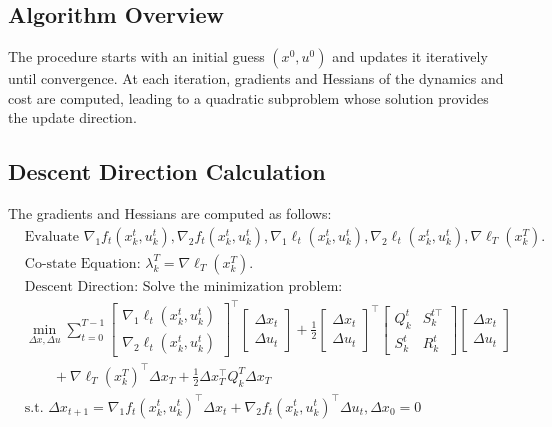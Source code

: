 \documentclass[a4paper,11pt,oneside]{book}
\begin{document}
\subsection{Algorithm Overview}
The procedure starts with an initial guess $(x^0, u^0)$ and updates it iteratively until convergence. At each iteration, gradients and Hessians of the dynamics and cost are computed, leading to a quadratic subproblem whose solution provides the update direction.

\subsection{Descent Direction Calculation}
The gradients and Hessians are computed as follows:
\begin{align}
&\text{Evaluate } \nabla_1 f_t(x_k^t, u_k^t), \nabla_2 f_t(x_k^t, u_k^t), \nabla_1 \ell_t(x_k^t, u_k^t),\nabla_2 \ell_t(x_k^t, u_k^t), \nabla \ell_T(x_k^T).\nonumber\\
&\text{Co-state Equation: } \lambda_k^T = \nabla \ell_T(x_k^T).\nonumber\\
&\text{Descent Direction: Solve the minimization problem:}\nonumber\\
&\min_{\Delta x, \Delta u} \sum_{t=0}^{T-1} \left[ \begin{array}{c}
\nabla_1 \ell_t(x_k^t, u_k^t) \\
\nabla_2 \ell_t(x_k^t, u_k^t)
\end{array} \right]^{\top} \left[ \begin{array}{c}
\Delta x_t\\
\Delta u_t
\end{array} \right] + \frac{1}{2} \left[ \begin{array}{c}
\Delta x_t \\
\Delta u_t
\end{array} \right]^{\top} \left[ \begin{array}{cc}
Q_k^t & S_k^{t\top} \\
S_k^t & R_k^t
\end{array} \right] \left[ \begin{array}{c}
\Delta x_t \\
\Delta u_t
\end{array} \right] \nonumber\\
&\qquad {}+ \nabla \ell_T(x_k^T)^{\top}\Delta x_T + \frac{1}{2} \Delta x_T^{\top} Q_k^T \Delta x_T \\
&\text{s.t. } \Delta x_{t+1} = \nabla_1 f_t(x_k^t, u_k^t)^{\top}\Delta x_t + \nabla_2 f_t(x_k^t, u_k^t)^{\top}\Delta u_t, \Delta x_0 = 0 \nonumber
\end{align}
\end{document}
